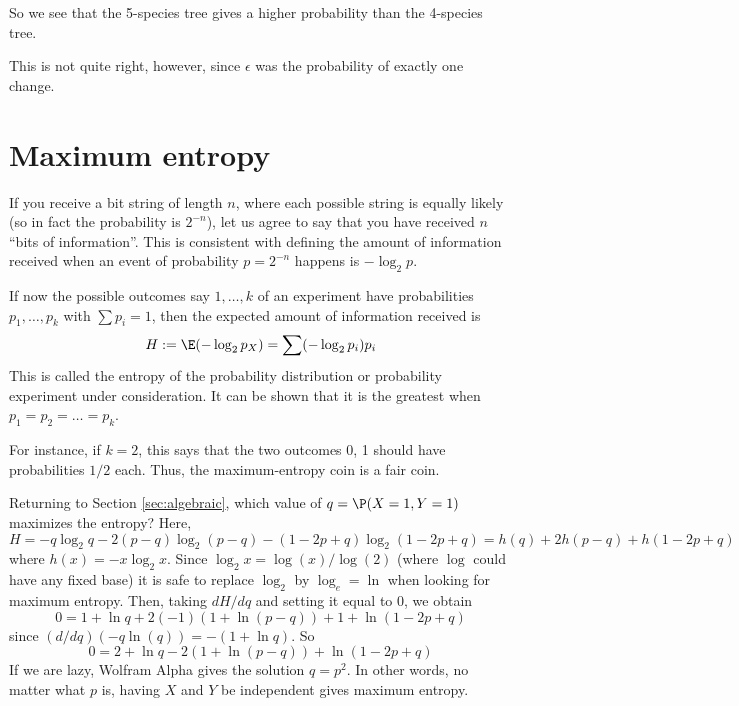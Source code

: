 So we see that the 5-species tree gives a higher probability than the 4-species tree.

This is not quite right, however, since $\epsilon$ was the probability of exactly one change.

\section{Maximum entropy}\label{maxEnt}



If you receive a bit string of length $n$, where each possible string is equally likely (so in fact the probability is $2^{-n}$), let us agree to say that you have received $n$ ``bits of information''.
This is consistent with defining the amount of information received when an event of probability $p=2^{-n}$ happens is $-\log_2 p$.

If now the possible outcomes say $1,\dots,k$ of an experiment have probabilities $p_1,\dots,p_k$ with $\sum p_i=1$, then the expected amount of information received is
\[
	H := \E(-\log_2 p_X) = \sum (-\log_2 p_i)p_i
\]
This is called the entropy of the probability distribution or probability experiment under consideration. It can be shown that it is the greatest when $p_1=p_2=\dots =p_k$.

For instance, if $k=2$, this says that the two outcomes 0, 1 should have probabilities $1/2$ each. Thus, the maximum-entropy coin is a fair coin.

Returning to Section \ref{sec:algebraic}, which value of $q=\P(X=1,Y=1)$ maximizes the entropy?
Here,
\[
	H = -q\log_2 q - 2(p-q)\log_2 (p-q) - (1-2p+q)\log_2(1-2p+q) = h(q)+2h(p-q)+h(1-2p+q)
\]
where $h(x)=-x\log_2 x$.
Since $\log_2 x = \log(x)/\log(2)$ (where $\log$ could have any fixed base) it is safe to replace $\log_2$ by $\log_e=\ln$ when looking for maximum entropy.
Then, taking $dH/dq$ and setting it equal to 0, we obtain
\[
	0 = 1+\ln q + 2(-1)(1+\ln(p-q)) + 1+\ln(1-2p+q)
\]
since $(d/dq)(-q\ln(q)) = -(1+\ln q)$. So
\[
	0 = 2+\ln q - 2(1+\ln(p-q)) + \ln(1-2p+q)
\]
If we are lazy, Wolfram Alpha gives the solution $q=p^2$. In other words, no matter what $p$ is, having $X$ and $Y$ be independent gives maximum entropy.
